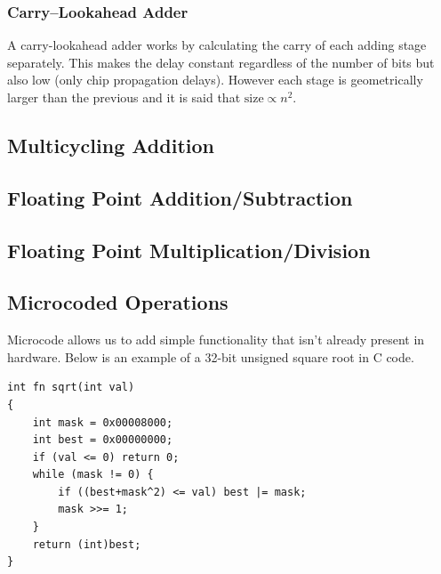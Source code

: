 \subsubsection{Carry--Lookahead Adder}
A carry-lookahead adder works by calculating the carry of each adding stage separately. This makes the delay constant regardless of the number of bits but also  low (only chip propagation delays). However each stage is geometrically larger than the previous and it is said that $\mbox{size} \propto n^2$.


\subsection{Multicycling Addition}
\subsection{Floating Point Addition/Subtraction}
\subsection{Floating Point Multiplication/Division}

\subsection{Microcoded Operations}
Microcode allows us to add simple functionality that isn't already present in hardware. Below is an example of a 32-bit unsigned square root in C code.

\begin{verbatim}
int fn sqrt(int val)
{
    int mask = 0x00008000;
    int best = 0x00000000;
    if (val <= 0) return 0;
    while (mask != 0) {
        if ((best+mask^2) <= val) best |= mask;
        mask >>= 1;
    }
    return (int)best;
}
\end{verbatim}





